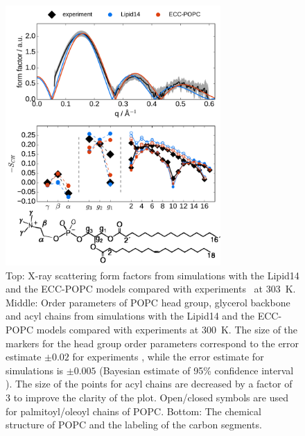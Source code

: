 \begin{figure}[tb!] 
  \centering 
  \includegraphics[width=8.2cm]{../img/ecc_popc/Order-parameters_form-factors_exp-L14-ECCL17_q80_sig89_POPC-struct.pdf} 
  \caption{ \label{simVSexpNOions} 
    Top: X-ray scattering form factors from simulations with the Lipid14 \citep{dickson14} and 
    the ECC-POPC \citep{melcr18} models compared with experiments~\citep{kucerka11} at 303~K. 
    Middle: Order parameters of POPC head group, glycerol backbone and acyl chains  
    from simulations with the Lipid14 and the ECC-POPC models 
    compared with experiments \citep{ferreira13} at 300~K. 
    The size of the markers for the head group order parameters correspond to 
    the error estimate $\pm 0.02$ for experiments \citep{botan15,ollila16}, 
    while the error estimate for simulations is $\pm 0.005$
    (Bayesian estimate of 95\% confidence interval \citep{scipy}).
    The size of the points for acyl chains are decreased by a factor of 3 to improve the clarity of the plot.
    Open/closed symbols are used for palmitoyl/oleoyl chains of POPC. 
    Bottom: The chemical structure of POPC and the labeling of the carbon segments. 
  }  
\end{figure} 


